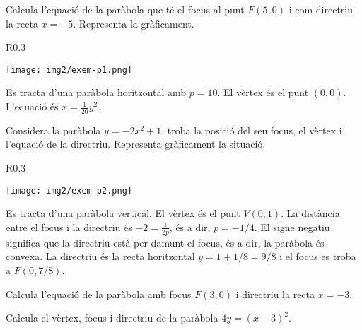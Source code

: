 \documentclass[11pt, a4paper, pdf]{article}
\begin{document}
\begin{resolt}[E]{ Calcula l'equació de la paràbola que té el focus al punt $F(5,0)$ i com directriu la recta $x=-5$. Representa-la gràficament.
	}
	\begin{wrapfigure}{R}{0.3\textwidth} 
		\vspace{-0.5cm}
		\begin{center}
			\texttt{[image: img2/exem-p1.png]}
		\end{center}
	\end{wrapfigure}
	
	
	
	Es tracta d'una paràbola horitzontal amb $p=10$. El vèrtex és el punt $(0,0)$.  L'equació és $x=\frac{1}{20}y^2$.
	
	\vspace*{1.5cm}
	
\end{resolt}
\begin{resolt}{Considera la paràbola  $y=-2 x^2 + 1$, troba la posició del seu focus, el vèrtex i l'equació de la directriu. Representa gràficament la situació.}
	\begin{wrapfigure}{R}{0.3\textwidth} 
		\vspace{-0.5cm}
		\begin{center}
			\texttt{[image: img2/exem-p2.png]}
		\end{center}
	\end{wrapfigure}
	
	
	Es tracta d'una paràbola vertical. El vèrtex és el punt $V(0, 1)$. La distància entre el focus i la directriu és $-2=\frac{1}{2p}$, és a dir, $p=-1/4$. El signe negatiu significa que la directriu està per damunt el focus, és a dir, la paràbola és convexa. La directriu és la recta horitzontal $y= 1+1/8=9/8$ i el focus es troba a $F(0,7/8)$. 
	
	
\end{resolt}
 
 \vspace{1cm}

\begin{mylist}
	\item Calcula l'equació de la paràbola amb focus $F(3,0)$ i directriu la recta $x=-3$.
	
	\item Calcula el vèrtex, focus i directriu de la paràbola $4y=(x-3)^2$.
\end{mylist}

 
\end{document}
